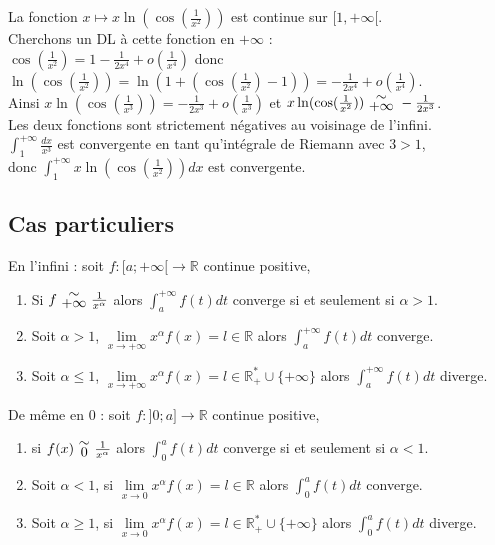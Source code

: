 \documentclass[a4paper,10pt]{book} %
\newcommand{\R}{\mathbb{R}}
\newcommand{\Rpe}{\mathbb{R}_{+}^{*}}
\newcommand{\equi}[1]{\renewcommand{\arraystretch}{0.3}~\begin{matrix}\sim\\#1\end{matrix}~\renewcommand{\arraystretch}{1}}
\newcommand{\displayAmath}{\displaystyle}
\begin{document}
La fonction $x\mapsto x \ln(\cos(\frac{1}{x^2}))$ est continue sur $[1,+\infty[$.\\

Cherchons un DL à cette fonction en $+\infty$ :\\
$\cos(\frac{1}{x^2})=1-\frac{1}{2x^4}+o(\frac{1}{x^4})$ donc $\ln(\cos(\frac{1}{x^2}))=\ln(1+(\cos(\frac{1}{x^2})-1))=-\frac{1}{2x^4}+o(\frac{1}{x^4})$.\\

Ainsi $x\ln(\cos(\frac{1}{x^3}))=-\frac{1}{2x^3}+o(\frac{1}{x^3})$ et $x\ln(\cos(\frac{1}{x^2}))\equi{+\infty}-\frac{1}{2x^3}$.\\

Les deux fonctions sont strictement négatives au voisinage de l'infini.\\

$\displayAmath \int_{1}^{+\infty}\frac{dx}{x^3}$ est convergente en tant qu'intégrale de Riemann avec $3>1$,\\
donc $\displayAmath \int_{1}^{+\infty}x \ln(\cos(\frac{1}{x^2}))dx$ est convergente.

\newpage

\subsection{Cas particuliers}
En l'infini : soit $f:[a;+\infty[\rightarrow \R$ continue positive,
\begin{enumerate}
\item Si $f\equi{+\infty}\frac{1}{x^\alpha}$ alors $\displayAmath\int_a^{+\infty}f(t)dt$ converge si et seulement si $\alpha>1$.

\item Soit $\alpha>1$, $\lim\limits_{x\rightarrow +\infty}x^\alpha f(x)=l\in\R$ alors $\displaystyle\int_a^{+\infty}f(t)dt$ converge.

\item Soit $\alpha\leq 1$, $\lim\limits_{x\rightarrow +\infty}x^\alpha f(x)=l\in\Rpe\cup\{+\infty\}$ alors $\displayAmath \int_a^{+\infty}f(t)dt$ diverge.
\end{enumerate}

\bigskip

De même en 0 : soit $f:]0;a]\rightarrow \R$ continue positive,
\begin{enumerate}
\item si $f(x)\equi{0}\frac{1}{x^\alpha}$ alors $\displayAmath\int_0^af(t)dt$ converge si et seulement si $\alpha<1$.

\item Soit $\alpha<1$, si $\lim\limits_{x\rightarrow 0}x^\alpha f(x)=l\in\R$ alors $\displayAmath\int_0^af(t)dt$ converge.

\item Soit $\alpha\geq1$, si $\lim\limits_{x\rightarrow 0}x^\alpha f(x)=l\in\Rpe\cup\{+\infty\}$ alors $\displayAmath\int_0^af(t)dt$ diverge.
\end{enumerate}
\end{document}
